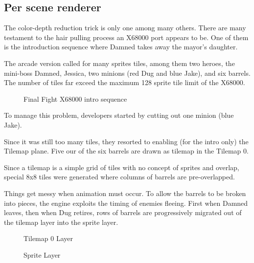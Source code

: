 \pagebreak

\subsection{Per scene renderer}

The color-depth reduction trick is only one among many others. There are many testament to the hair pulling process an X68000 port appears to be. One of them is the introduction sequence where Damned takes away the mayor's daughter.

The arcade version called for many sprites tiles, among them two heroes, the mini-boss Damned, Jessica, two minions (red Dug and blue Jake), and six barrels. The number of tiles far exceed the maximum 128 sprite tile limit of the X68000.

\begin{figure}[H]
\caption*{Final Fight X68000 intro sequence}
\end{figure}

To manage this problem, developers started by cutting out one minion (blue Jake). 

Since it was still too many tiles, they resorted to enabling (for the intro only) the Tilemap plane. Five our of the six barrels are drawn as tilemap in the Tilemap 0.

Since a tilemap is a simple grid of tiles with no concept of sprites and overlap, special 8x8 tiles were generated where columns of barrels are pre-overlapped.

Things get messy when animation must occur. To allow the barrels to be broken into pieces, the engine exploits the timing of enemies fleeing. First when Damned leaves, then when Dug retires, rows of barrels are progressively migrated out of the tilemap layer into the sprite layer. 



\begin{minipage}[!t]{0.49\linewidth}
\vspace{-3mm}
  \begin{figure}[H]
  \caption*{Tilemap 0 Layer}
  \end{figure}
\end{minipage}%
\hfill
\begin{minipage}[!t]{0.49\linewidth}
\vspace{-3mm}
   \begin{figure}[H]
  \caption*{Sprite Layer}
  \end{figure}
\end{minipage}

